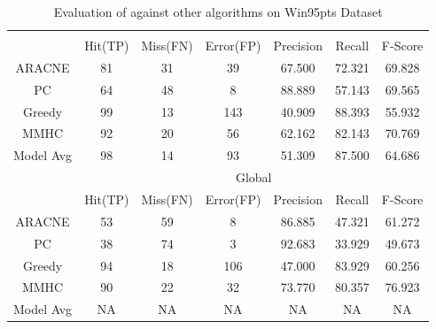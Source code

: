 \begin{table}[th]
\begin{center}
\caption{\label{tab:win95ptsComp}Evaluation of \lama{} against other algorithms on Win95pts Dataset}
\small
\begin{tabular}{|c|c|c|c|c|c|c|}
\hline
 &\multicolumn{6}{c|}{\lama{}}\\
\cline{2-7}
 & Hit(TP) & Miss(FN) & Error(FP) & Precision & Recall & F-Score \\
\hline
ARACNE & 81 & 31 & 39 & 67.500 & 72.321 & 69.828 \\
PC     & 64 & 48 & 8  & 88.889 & 57.143 & 69.565 \\
Greedy & 99 & 13 & 143& 40.909 & 88.393 & 55.932 \\
MMHC   & 92 & 20 & 56 & 62.162 & 82.143 & 70.769 \\
\hline
Model Avg & 98 & 14 & 93 & 51.309 & 87.500 & 64.686 \\
\hline \hline
&\multicolumn{6}{c|}{Global}\\
\cline{2-7}
 & Hit(TP) & Miss(FN) & Error(FP) & Precision & Recall & F-Score  \\
\hline
ARACNE & 53 & 59 & 8 & 86.885 & 47.321 & 61.272 \\
PC     & 38 & 74 & 3 & 92.683 & 33.929 & 49.673 \\
Greedy & 94 & 18 &106& 47.000 & 83.929 & 60.256 \\
MMHC   & 90 & 22 & 32& 73.770 & 80.357 & 76.923 \\
\hline
Model Avg & NA & NA & NA & NA & NA & NA \\
\hline
\end{tabular}
\end{center}
\end{table}

